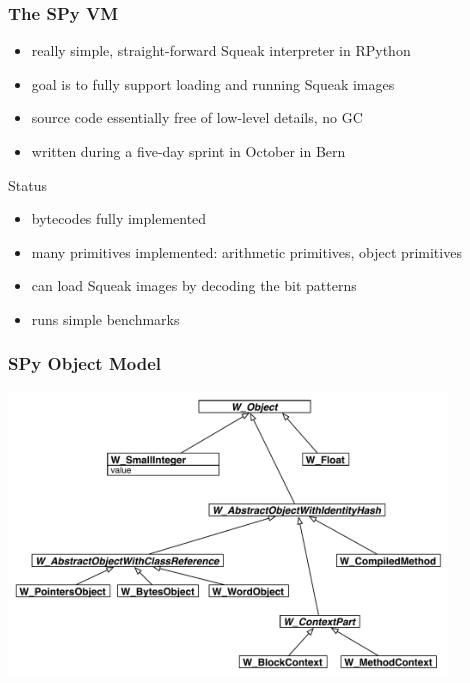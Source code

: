 \documentclass[utf8x]{beamer}
\begin{document}
\begin{frame}
    \frametitle{The SPy VM}
    \begin{itemize}
        \item really simple, straight-forward Squeak interpreter in RPython
        \item goal is to fully support loading and running Squeak images
        \item source code essentially free of low-level details, no GC
        \item written during a five-day sprint in October in Bern
    \end{itemize}
    \pause
    \begin{block} {Status}
        \begin{itemize}
        \item bytecodes fully implemented
        \item many primitives implemented: arithmetic primitives, object primitives
        \item can load Squeak images by decoding the bit patterns
        \item runs simple benchmarks
        \end{itemize}
    \end{block}
\end{frame}

\begin{frame}[plain]
    \frametitle{SPy Object Model}
    \includegraphics[height=7.5cm]{objmodel}
\end{frame}
\end{document}
